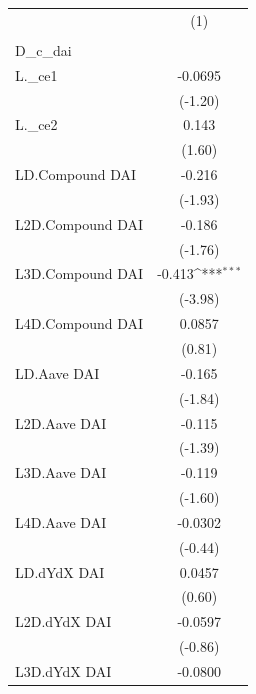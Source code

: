 {
\def\sym#1{\ifmmode^{#1}\else\(^{#1}\)\fi}
\begin{tabular}{l*{1}{c}}
\toprule
                    &\multicolumn{1}{c}{(1)}\\
                    &\multicolumn{1}{c}{} \\
\midrule
D\_c\_dai             &                     \\
L.\_ce1              &     -0.0695         \\
                    &     (-1.20)         \\
\addlinespace
L.\_ce2              &       0.143         \\
                    &      (1.60)         \\
\addlinespace
LD.Compound DAI     &      -0.216         \\
                    &     (-1.93)         \\
\addlinespace
L2D.Compound DAI    &      -0.186         \\
                    &     (-1.76)         \\
\addlinespace
L3D.Compound DAI    &      -0.413\sym{***}\\
                    &     (-3.98)         \\
\addlinespace
L4D.Compound DAI    &      0.0857         \\
                    &      (0.81)         \\
\addlinespace
LD.Aave DAI         &      -0.165         \\
                    &     (-1.84)         \\
\addlinespace
L2D.Aave DAI        &      -0.115         \\
                    &     (-1.39)         \\
\addlinespace
L3D.Aave DAI        &      -0.119         \\
                    &     (-1.60)         \\
\addlinespace
L4D.Aave DAI        &     -0.0302         \\
                    &     (-0.44)         \\
\addlinespace
LD.dYdX DAI         &      0.0457         \\
                    &      (0.60)         \\
\addlinespace
L2D.dYdX DAI        &     -0.0597         \\
                    &     (-0.86)         \\
\addlinespace
L3D.dYdX DAI        &     -0.0800         \\

\end{tabular}}
